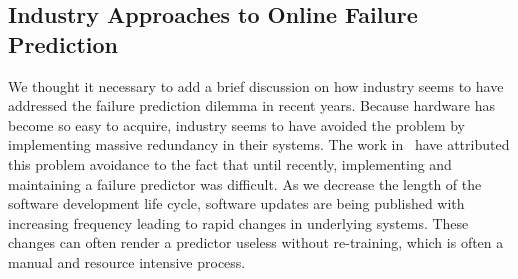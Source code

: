 \subsection{Industry Approaches to Online Failure Prediction} \label{industry}
We thought it necessary to add a brief discussion on how industry seems to have addressed the failure prediction dilemma in recent years.  Because hardware has become so easy to acquire, industry seems to have avoided the problem by implementing massive redundancy in their systems.  The work in~\cite{watanabe2014,irrera2015} have attributed this problem avoidance to the fact that until recently, implementing and maintaining a failure predictor was difficult.  As we decrease the length of the software development life cycle, software updates are being published with increasing frequency leading to rapid changes in underlying systems.  These changes can often render a predictor useless without re-training, which is often a manual and resource intensive process.
